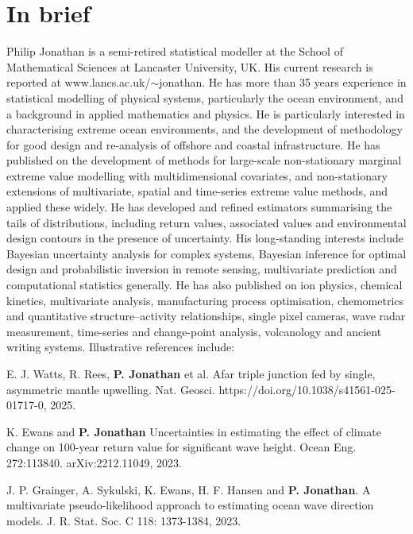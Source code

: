 \documentclass[11pt,a4paper]{moderncv}
\begin{document}
\makecvtitle

\vspace{-30pt}

\section{In brief}

\setlength{\parskip}{0.5em}

Philip Jonathan is a semi-retired statistical modeller at the School of Mathematical Sciences at Lancaster University, UK. His current research is reported at www.lancs.ac.uk/$\sim$jonathan. He has more than 35 years experience in statistical modelling of physical systems, particularly the ocean environment, and a background in applied mathematics and physics. He is particularly interested in characterising extreme ocean environments, and the development of methodology for good design and re-analysis of offshore and coastal infrastructure. He has published on the development of methods for large-scale non-stationary marginal extreme value modelling with multidimensional covariates, and non-stationary extensions of multivariate, spatial and time-series extreme value methods, and applied these widely. He has developed and refined estimators summarising the tails of distributions, including return values, associated values and environmental design contours in the presence of uncertainty. His long-standing interests include Bayesian uncertainty analysis for complex systems, Bayesian inference for optimal design and probabilistic inversion in remote sensing, multivariate prediction and computational statistics generally. He has also published on ion physics, chemical kinetics, multivariate analysis, manufacturing process optimisation, chemometrics and quantitative structure--activity relationships, single pixel cameras, wave radar measurement, time-series and change-point analysis, volcanology and ancient writing systems. Illustrative references include:

\setlength{\parskip}{0.2em}

E. J. Watts, R. Rees, \textbf{P. Jonathan} et al.  Afar triple junction fed by single, asymmetric mantle upwelling. Nat. Geosci. https://doi.org/10.1038/s41561-025-01717-0, 2025.

K. Ewans and \textbf{P. Jonathan} Uncertainties in estimating the effect of climate change on 100-year return value for significant wave height. Ocean Eng. 272:113840. arXiv:2212.11049, 2023.

J. P. Grainger, A. Sykulski, K. Ewans, H. F. Hansen and \textbf{P. Jonathan}. A multivariate pseudo-likelihood approach to estimating ocean wave direction models. J. R. Stat. Soc. C 118: 1373-1384, 2023.
\end{document}
